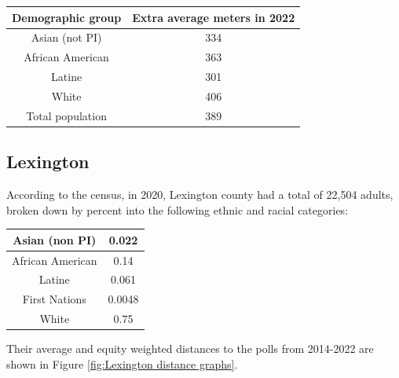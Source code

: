 \documentclass[11pt]{article}
\theoremstyle{remark}
\theoremstyle{definition}
\begin{document}
\begin{tabular}{|c|c|}
	\hline
	Demographic group & Extra average meters in 2022 \\ \hline
	Asian (not PI) &   334 \\ \hline
	African American &   363  \\ \hline
	Latine & 301 \\ \hline
	White &  406\\ \hline
	Total population &  389\\ \hline
\end{tabular}

\subsection{Lexington \label{sec:Lexington distances}}
According to the census, in 2020, Lexington county had a total of 22,504  adults, broken down by percent into the following ethnic and racial categories:

\begin{tabular} {| c | c |} 
	\hline
	Asian (non PI) &  0.022 \\ \hline
	African American & 0.14 \\ \hline
	Latine & 0.061 \\ \hline
	First Nations & 0.0048 \\ \hline
	White  & 0.75 \\ \hline
\end{tabular}


Their average and equity weighted distances to the polls from 2014-2022 are shown in Figure \ref{fig:Lexington distance graphs}.
\end{document}
